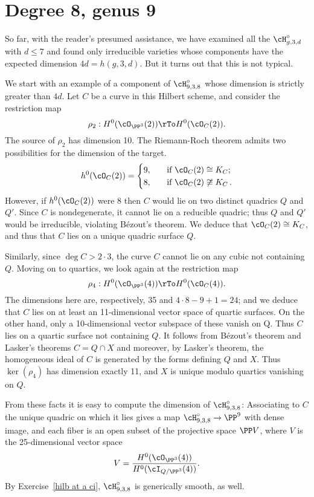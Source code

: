 \section{Degree 8, genus 9}\label{degree 8 section}

So far, with the reader's presumed assistance, we have examined all the $\cH^\circ_{g,3,d}$ with $d\leq 7$
and found only irreducible varieties whose components have the expected dimension $4d = h(g,3,d)$. But it turns out that
this is not typical.

We start with an example of a component of $\cH^\circ_{9,3,8}$ whose dimension is strictly greater than $4d$.  Let $C$ be  a curve in this Hilbert scheme, and consider the restriction map
$$
\rho_2 : H^0(\cO_{\PP^3}(2)) \rTo H^0(\cO_C(2)).
$$
The source of $\rho_2$ has dimension 10. The Riemann-Roch theorem admits two possibilities for the dimension
of the target.
\begin{align*}
h^0(\cO_C(2)) =
\begin{cases}
9, \quad &\text{if } \cO_C(2) \cong K_C; \\
8,  \quad &\text{if } \cO_C(2) \not\cong K_C\,.
\end{cases}
\end{align*}
However, if $h^0(\cO_C(2))$ were 8 then $C$ would  lie on two distinct quadrics $Q$ and $Q'$. Since $C$ is nondegenerate, it cannot lie on a reducible quadric; thus $Q$ and $Q'$ would  be irreducible,  violating B\'ezout's theorem. We deduce that $\cO_C(2) \cong K_C$, and thus that $C$ lies on a unique quadric surface $Q$.

Similarly, since $\deg C > 2\cdot 3$, the curve $C$ cannot lie on any cubic not containing $Q$. Moving on to quartics, we look again at the restriction map
$$
\rho_4 : H^0(\cO_{\PP^3}(4)) \rTo H^0(\cO_C(4)).
$$
The dimensions here are, respectively, 35 and $4\cdot 8 - 9 + 1 = 24$; and we deduce that $C$ lies on at least an 11-dimensional vector space of quartic surfaces. On the other hand, only a 10-dimensional vector subspace of these vanish on Q. Thus $C$ lies on a quartic surface not containing $Q$. It follows from B\'ezout's theorem and 
Lasker's theorems  $C = Q \cap X$
and moreover, by Lasker's theorem, the homogeneous ideal of $C$ is generated by the forms defining $Q$ and $X$. Thus $\ker(\rho_4)$ has dimension exactly 11, and  $X$ is unique modulo quartics vanishing on $Q$.

From these facts it is easy to compute the dimension of  $\cH^\circ_{9,3,8}$: Associating to $C$ the unique quadric on which it lies gives a map $\cH^\circ_{9,3,8} \to \PP^9$ with dense image, and each fiber is an open subset of the projective space $\PP V$, where $V$ is the 25-dimensional vector space
$$
V = \frac{H^0(\cO_{\PP^3}(4))}{H^0(\cI_{Q/\PP^3}(4))}.
$$
By Exercise~\ref{hilb at a ci}, $\cH^\circ_{9,3,8}$ is generically smooth, as well.

